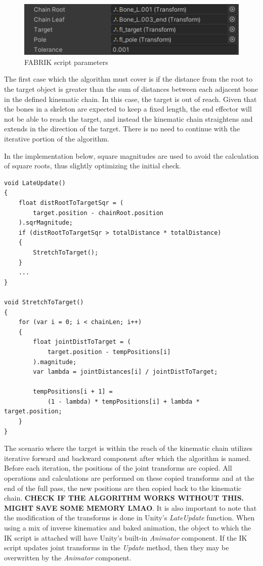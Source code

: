 \begin{figure}
    \includegraphics{grafika/parametry_ik.png}
    \caption{FABRIK script parameters}
    \label{fig:params}
\end{figure}

The first case which the algorithm must cover is if the distance from the root
to the target object is greater than the sum of distances between each adjacent
bone in the defined kinematic chain. In this case, the target is out of reach. Given
that the bones in a skeleton are expected to keep a fixed length, the end
effector will not be able to reach the target, and instead the kinematic chain
straightens and extends in the direction of the target. There is no need to
continue with the iterative portion of the algorithm.

In the implementation below, square magnitudes are used to
avoid the calculation of square roots, thus slightly optimizing the initial
check.

\begin{lstlisting}[basicstyle=\footnotesize, numbers=none,frame=single, caption={Target out of
reach},captionpos=b, label=stretch, language={[Sharp]c}]
void LateUpdate() 
{
    float distRootToTargetSqr = (
        target.position - chainRoot.position
    ).sqrMagnitude;
    if (distRootToTargetSqr > totalDistance * totalDistance)
    {
        StretchToTarget();
    }
    ...
}

void StretchToTarget()
{
    for (var i = 0; i < chainLen; i++)
    {
        float jointDistToTarget = (
            target.position - tempPositions[i]
        ).magnitude;
        var lambda = jointDistances[i] / jointDistToTarget;

        tempPositions[i + 1] =
            (1 - lambda) * tempPositions[i] + lambda * target.position;
    }
}
\end{lstlisting}

The scenario where the target is within the reach of the kinematic chain
utilizes iterative forward and backward component after which the algorithm is
named. Before each iteration, the positions of the joint transforms are copied.
All operations and calculations are performed on these copied transforms and at
the end of the full pass, the new positions are then copied back to the
kinematic chain. \textbf{CHECK IF THE ALGORITHM WORKS WITHOUT THIS. MIGHT SAVE
SOME MEMORY LMAO}. It is also important to note that the modification of the
transforms is done in Unity's \textit{LateUpdate} function. When using a mix of
inverse kinematics and baked animation, the object to which the IK script is
attached will have Unity's built-in \textit{Animator} component. If the IK
script updates joint transforms in the \textit{Update} method, then they may be
overwritten by the \textit{Animator} component. 

